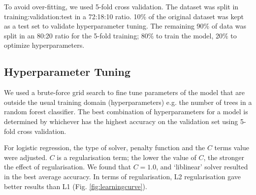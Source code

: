 To avoid over-fitting, we used 5-fold cross validation. The  dataset was split in training:validation:test in a 72:18:10 ratio. 10\% of the original dataset was kept as a test set to validate hyperparameter tuning. The remaining 90\% of data was split in an 80:20 ratio for the 5-fold training; 80\% to train the model, 20\% to optimize hyperparameters. %

\subsection{Hyperparameter Tuning} \label{hpt}
We used a brute-force grid search to fine tune parameters of the model that are outside the usual training domain (hyperparameters) e.g. the number of trees in a random forest classifier.
The best combination of hyperparameters for a model is determined by whichever has the highest accuracy on the validation set using 5-fold cross validation.

For logistic regression, the type of solver, penalty function and the $C$  terms value were adjusted. $C$ is a regularisation term; 
the lower the value of $C$, the stronger the effect of regularisation. We found that  $C=1.0$, and `liblinear' solver resulted in the best average accuracy. In terms of regularisation, L2 regularisation gave better results than L1 (Fig. \ref{fig:learningcurve}).

